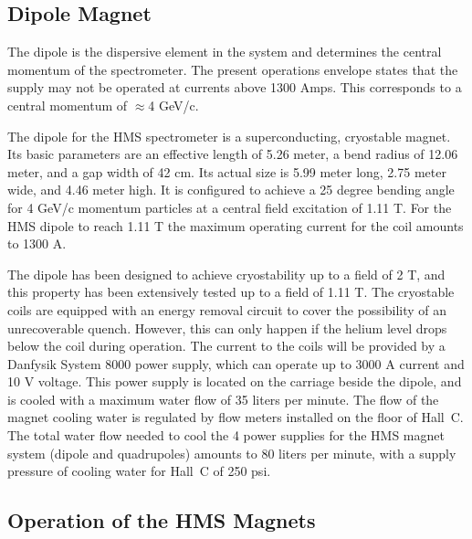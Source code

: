 \vspace{0.5in}
\hspace*{3.5in}{\underline{~~~~~~~~~~~~~~~~~~~~~~~~~~~~~~~~~}}
\newline
\hspace*{3.5in}{Signature~~~~~~~~~~~~Date}

\newpage
\subsection{Dipole Magnet }

The dipole is the dispersive element in the system and 
determines the central momentum of the spectrometer.
The present operations envelope states that the supply may not be
operated at currents above 1300 Amps. This corresponds to a central
momentum of $\approx$4 GeV/c.

The dipole for the HMS spectrometer is a superconducting, cryostable magnet.
Its basic parameters are an effective length of 5.26 meter,
a bend radius of 12.06 meter, and a gap width of 42 cm.
Its actual size is 5.99 meter long, 2.75 meter wide, and 4.46 meter high.
It is configured to achieve a 25 degree bending angle for 4 GeV/c momentum
particles at a central field excitation of 1.11 T.
For the HMS dipole to reach 1.11 T the maximum operating current for the coil
amounts to 1300 A.

The dipole has been designed to achieve cryostability up to a field of 2 T,
and this property has been extensively tested up to a field of 1.11 T.
The cryostable coils are equipped with an energy removal circuit to cover
the possibility of an unrecoverable quench. \cite{bi:hms2}
However, this can only happen
if the helium level drops below the coil during operation.
The current to the coils will be provided by a Danfysik System 8000 power
supply, which can operate up to 3000 A current and 10 V voltage.
This power supply is located on the carriage beside the dipole, and
is cooled with a maximum water flow of 35 liters per minute.
The flow of the magnet cooling water is regulated by flow meters installed
on the floor of Hall~C. The total water flow needed to cool the 4 power
supplies for the HMS magnet system (dipole and quadrupoles) amounts
to 80 liters per minute, with a supply pressure of cooling water for
Hall~C of 250 psi.


\subsection{Operation of the HMS Magnets}

